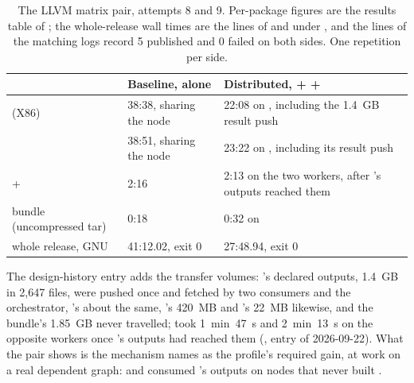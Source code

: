 \begin{table}[!htp]
\centering\footnotesize
\caption{The LLVM matrix pair, attempts 8 and 9. Per-package figures are the
results table of \protect{}; the whole-release wall
times are the  lines of
\protect{} and \protect{}
under \protect{},
and the  lines of the matching logs record 5 published and 0
failed on both sides. One repetition per side.}
\label{tab:eval:llvm-matrix}
\begin{tabular}{@{}L{4.6cm}L{3.6cm}L{5cm}@{}}
\toprule
& Baseline,  alone & Distributed,  +  +
 \\
\midrule
{} (X86) & 38:38, sharing the node & 22:08 on , including
the 1.4~GB result push \\
 & 38:51, sharing the node & 23:22 on , including
its result push \\
 +  & 2:16 & 2:13 on the two workers, after 's
outputs reached them \\
bundle (uncompressed tar) & 0:18 & 0:32 on  \\
whole release, GNU  & 41:12.02, exit 0 & 27:48.94, exit 0 \\
\bottomrule
\end{tabular}
\end{table}

The design-history entry adds the transfer volumes: 's declared
outputs, 1.4~GB in 2,647 files, were pushed once and fetched by two consumers
and the orchestrator, 's about the same, 's
420~MB and 's 22~MB likewise, and the bundle's 1.85~GB never
travelled;  took 1~min~47~s and  2~min~13~s on the
opposite workers once 's outputs had reached them
(, entry of 2026-09-22). What the pair shows is the
mechanism  names as the profile's required gain, at work on a real
dependent graph:  and  consumed 's outputs on
nodes that never built .

